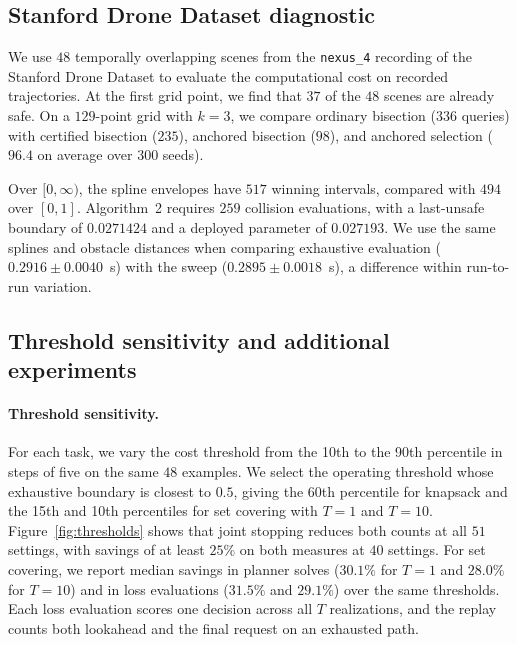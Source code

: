 \documentclass[a4paper,10pt]{article}
\theoremstyle{plain}
\theoremstyle{remark}
\begin{document}
\subsection{Stanford Drone Dataset diagnostic}\label{sec:sdd}

We use $48$ temporally overlapping scenes from the \texttt{nexus\_4} recording of the Stanford Drone Dataset \cite{cdt,sdd} to evaluate the computational cost on recorded trajectories. At the first grid point, we find that $37$ of the $48$ scenes are already safe. On a $129$-point grid with $k=3$, we compare ordinary bisection ($336$ queries) with certified bisection ($235$), anchored bisection ($98$), and anchored selection ($96.4$ on average over $300$ seeds).

Over $[0,\infty)$, the spline envelopes have $517$ winning intervals, compared with $494$ over $[0,1]$. Algorithm~2 requires $259$ collision evaluations, with a last-unsafe boundary of $0.0271424$ and a deployed parameter of $0.027193$. We use the same splines and obstacle distances when comparing exhaustive evaluation ($0.2916\pm0.0040$~s) with the sweep ($0.2895\pm0.0018$~s), a difference within run-to-run variation.

\subsection{Threshold sensitivity and additional experiments}\label{sec:extended}

\paragraph{Threshold sensitivity.} For each task, we vary the cost threshold from the 10th to the 90th percentile in steps of five on the same $48$ examples. We select the operating threshold whose exhaustive boundary is closest to $0.5$, giving the 60th percentile for knapsack and the 15th and 10th percentiles for set covering with $T=1$ and $T=10$. Figure~\ref{fig:thresholds} shows that joint stopping reduces both counts at all $51$ settings, with savings of at least $25\%$ on both measures at $40$ settings. For set covering, we report median savings in planner solves ($30.1\%$ for $T=1$ and $28.0\%$ for $T=10$) and in loss evaluations ($31.5\%$ and $29.1\%$) over the same thresholds. Each loss evaluation scores one decision across all $T$ realizations, and the replay counts both lookahead and the final request on an exhausted path.
\end{document}
